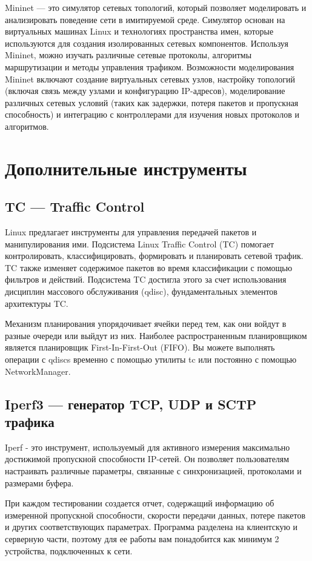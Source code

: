 Mininet --- это симулятор сетевых топологий, который позволяет моделировать и
анализировать поведение сети в имитируемой среде. Симулятор основан на
виртуальных машинах Linux и технологиях пространства имен, которые используются
для создания изолированных сетевых компонентов. Используя Mininet, можно
изучать различные сетевые протоколы, алгоритмы маршрутизации и методы
управления трафиком. Возможности моделирования Mininet включают создание
виртуальных сетевых узлов, настройку топологий (включая связь между узлами и
конфигурацию IP-адресов), моделирование различных сетевых условий (таких как
задержки, потеря пакетов и пропускная способность) и интеграцию с контроллерами
для изучения новых протоколов и алгоритмов.

\section{Дополнительные инструменты} %
\label{chap1:sec4}

\subsection{TC --- Traffic Control}
\label{chap1:sec4:sub1}

Linux предлагает инструменты для управления передачей пакетов и манипулирования
ими. Подсистема Linux Traffic Control (TC) помогает контролировать,
классифицировать, формировать и планировать сетевой трафик. TC также изменяет
содержимое пакетов во время классификации с помощью фильтров и действий.
Подсистема TC достигла этого за счет использования дисциплин массового
обслуживания (qdisc), фундаментальных элементов архитектуры TC. 

Механизм планирования упорядочивает ячейки перед тем, как они войдут в разные
очереди или выйдут из них. Наиболее распространенным планировщиком является
планировщик First-In-First-Out (FIFO). Вы можете выполнять операции с qdiscs
временно с помощью утилиты tc или постоянно с помощью NetworkManager.

\subsection{Iperf3 --- генератор TCP, UDP и SCTP трафика}
\label{chap1:sec4:sub2}

Iperf - это инструмент, используемый для активного измерения максимально
достижимой пропускной способности IP-сетей. Он позволяет пользователям
настраивать различные параметры, связанные с синхронизацией, протоколами и
размерами буфера. 

При каждом тестировании создается отчет, содержащий информацию об измеренной
пропускной способности, скорости передачи данных, потере пакетов и других
соответствующих параметрах. Программа разделена на клиентскую и серверную
части, поэтому для ее работы вам понадобится как минимум 2 устройства,
подключенных к сети. 


